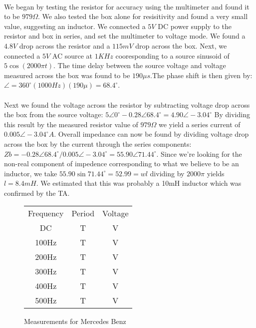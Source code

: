 \documentclass{article}
\begin{document}
\paragraph{}
We began by testing the resistor for accuracy using the multimeter and found
it to be $979\Omega{}$. We also tested the box alone for resisitivity and found
a very small value, suggesting an inductor. We connected a $5V$ DC power supply
to the resistor and box in series, and set the multimeter to voltage mode. We
found a $4.8V$ drop across the resistor and a $115mV$ drop across the box. Next,
we connected a $5V$ AC source at $1KHz$ cooresponding to a source sinusoid of
$5\cos{}(2000\pi{} t)$. The time delay between the source voltage and voltage 
measured across the box was found to be $190\mu{} s$.The phase shift is then 
given by: $\angle{} = 360^\circ{}(1000Hz)(190\mu{}) = 68.4^\circ{}$. 

\paragraph{} 
Next we found the voltage across the resistor by subtracting voltage drop across
the box from the source voltage:
$5\angle{}0^\circ{} - 0.28\angle{}68.4^\circ{} = 4.90\angle{}-3.04^\circ{}$ By
dividing this result by the measured resistor value of $979\Omega$ we yield a 
series current of $0.005\angle{}-3.04^\circ{}A$. Overall impedance can now be 
found by dividing voltage drop across the box by the current through the series
components: 
$Zb= -0.28\angle{}68.4^\circ{} / 0.005\angle{}-3.04^\circ{} = 55.90\angle{}71.44^\circ{}$.
Since we're looking for the non-real component of impedence corresponding to what 
we believe to be an inductor, we take $55.90\sin{}71.44^\circ{} = 52.99 = wl$ 
dividing by $2000\pi{}$ yields $l=8.4mH$. We estimated that this was probably
a 10mH inductor which was confirmed by the TA.   


\begin{figure}[!h]
\caption{Measurements for Mercedes Benz}
\begin{center}
\begin{tabular}{|c|c|c|}
\hline
Frequency & Period & Voltage\\
DC & T & V\\
\hline
100Hz & T & V\\
\hline
200Hz & T & V\\
\hline
300Hz & T & V\\
\hline
400Hz & T & V\\
\hline
500Hz & T & V\\
\hline
\end{tabular}
\end{center}
\end{figure}
\end{document}
